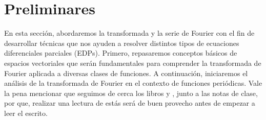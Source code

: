 \section{Preliminares}\label{sec:preliminares}
  En esta sección, abordaremos la transformada y la serie de Fourier con el fin de desarrollar técnicas que nos ayuden a resolver distintos tipos de ecuaciones diferenciales parciales (EDPs). Primero, repasaremos conceptos básicos de espacios vectoriales que serán fundamentales para comprender la transformada de Fourier aplicada a diversas clases de funciones. A continuación, iniciaremos el análisis de la transformada de Fourier en el contexto de funciones periódicas. Vale la pena mencionar que seguimos de cerca los libros \cite{MR2597943} y \cite{MR3243734}, junto a las notas de clase, por que, realizar una lectura de estás será de buen provecho antes de empezar a leer el escrito.
